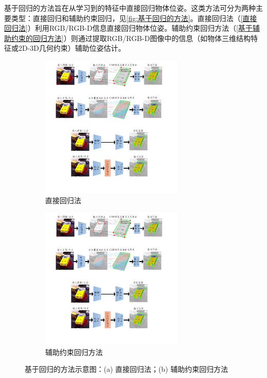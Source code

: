 \par 基于回归的方法旨在从学习到的特征中直接回归物体位姿。这类方法可分为两种主要类型：直接回归和辅助约束回归，见\autoref{fig:基于回归的方法}。直接回归法（\autoref{直接回归法}）利用RGB/RGB-D信息直接回归物体位姿。辅助约束回归方法（\autoref{基于辅助约束的回归方法}）则通过提取RGB/RGB-D图像中的信息（如物体三维结构特征或2D-3D几何约束）辅助位姿估计。

\begin{figure}[htbp]
    \centering
    \begin{subfigure}[b]{0.95\textwidth}
        \centering
        \includegraphics[width=0.75\textwidth]{figure/intro/直接回归法.pdf}
        \caption{直接回归法}
        \label{fig:直接回归法}
    \end{subfigure}
    \vfill
    \begin{subfigure}[b]{0.95\textwidth}
        \centering
        \includegraphics[width=0.75\textwidth]{figure/intro/辅助约束回归方法.pdf}
        \caption{辅助约束回归方法}
        \label{fig:基于辅助约束的回归方法}
    \end{subfigure}
    \caption{基于回归的方法示意图：(a) 直接回归法；(b) 辅助约束回归方法}
    \label{fig:基于回归的方法}
\end{figure}

